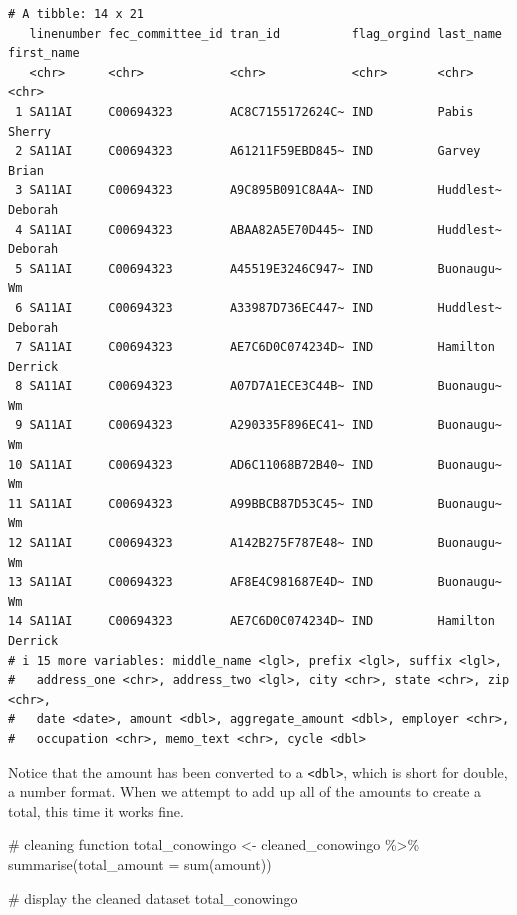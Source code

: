 \documentclass[
  letterpaper,
  DIV=11,
  numbers=noendperiod]{scrreprt}
\newenvironment{Shaded}{\begin{snugshade}}{\end{snugshade}}
\newcommand{\AttributeTok}[1]{\textcolor[rgb]{0.40,0.45,0.13}{#1}}
\newcommand{\CommentTok}[1]{\textcolor[rgb]{0.37,0.37,0.37}{#1}}
\newcommand{\FunctionTok}[1]{\textcolor[rgb]{0.28,0.35,0.67}{#1}}
\newcommand{\NormalTok}[1]{\textcolor[rgb]{0.00,0.23,0.31}{#1}}
\newcommand{\OtherTok}[1]{\textcolor[rgb]{0.00,0.23,0.31}{#1}}
\newcommand{\SpecialCharTok}[1]{\textcolor[rgb]{0.37,0.37,0.37}{#1}}
\begin{document}
\begin{verbatim}
# A tibble: 14 x 21
   linenumber fec_committee_id tran_id          flag_orgind last_name first_name
   <chr>      <chr>            <chr>            <chr>       <chr>     <chr>     
 1 SA11AI     C00694323        AC8C7155172624C~ IND         Pabis     Sherry    
 2 SA11AI     C00694323        A61211F59EBD845~ IND         Garvey    Brian     
 3 SA11AI     C00694323        A9C895B091C8A4A~ IND         Huddlest~ Deborah   
 4 SA11AI     C00694323        ABAA82A5E70D445~ IND         Huddlest~ Deborah   
 5 SA11AI     C00694323        A45519E3246C947~ IND         Buonaugu~ Wm        
 6 SA11AI     C00694323        A33987D736EC447~ IND         Huddlest~ Deborah   
 7 SA11AI     C00694323        AE7C6D0C074234D~ IND         Hamilton  Derrick   
 8 SA11AI     C00694323        A07D7A1ECE3C44B~ IND         Buonaugu~ Wm        
 9 SA11AI     C00694323        A290335F896EC41~ IND         Buonaugu~ Wm        
10 SA11AI     C00694323        AD6C11068B72B40~ IND         Buonaugu~ Wm        
11 SA11AI     C00694323        A99BBCB87D53C45~ IND         Buonaugu~ Wm        
12 SA11AI     C00694323        A142B275F787E48~ IND         Buonaugu~ Wm        
13 SA11AI     C00694323        AF8E4C981687E4D~ IND         Buonaugu~ Wm        
14 SA11AI     C00694323        AE7C6D0C074234D~ IND         Hamilton  Derrick   
# i 15 more variables: middle_name <lgl>, prefix <lgl>, suffix <lgl>,
#   address_one <chr>, address_two <lgl>, city <chr>, state <chr>, zip <chr>,
#   date <date>, amount <dbl>, aggregate_amount <dbl>, employer <chr>,
#   occupation <chr>, memo_text <chr>, cycle <dbl>
\end{verbatim}

Notice that the amount has been converted to a
\texttt{\textless{}dbl\textgreater{}}, which is short for double, a
number format. When we attempt to add up all of the amounts to create a
total, this time it works fine.

\begin{Shaded}
\begin{Highlighting}[]
\CommentTok{\# cleaning function}
\NormalTok{total\_conowingo }\OtherTok{\textless{}{-}}\NormalTok{ cleaned\_conowingo }\SpecialCharTok{\%\textgreater{}\%}
  \FunctionTok{summarise}\NormalTok{(}\AttributeTok{total\_amount =} \FunctionTok{sum}\NormalTok{(amount))}

\CommentTok{\# display the cleaned dataset}
\NormalTok{total\_conowingo}
\end{Highlighting}
\end{Shaded}
\end{document}
